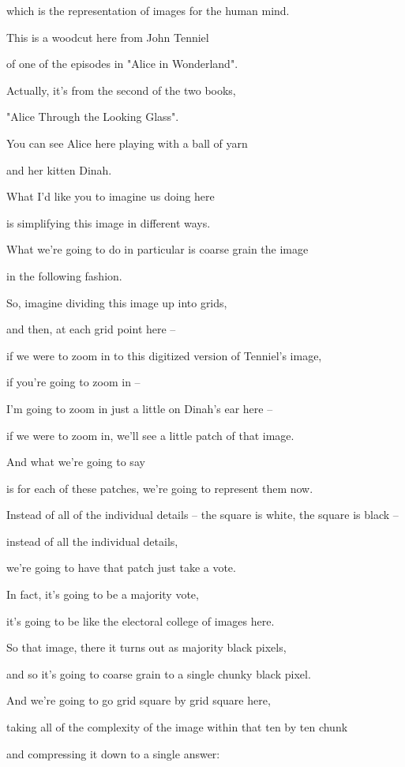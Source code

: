 \documentclass[]{article}
\begin{document}
which is the representation
of images for the human mind.

This is a woodcut here from John Tenniel

of one of the episodes
in "Alice in Wonderland".

Actually, it's from the second
of the two books,

"Alice Through the Looking Glass".

You can see Alice here
playing with a ball of yarn

and her kitten Dinah.

What I'd like you to imagine
us doing here

is simplifying this image
in different ways.

What we're going to do in particular
is coarse grain the image

in the following fashion.

So, imagine dividing
this image up into grids,

and then, at each grid point here –

if we were to zoom in to this digitized
version of Tenniel's image,

if you're going to zoom in –

I'm going to zoom in
just a little on Dinah's ear here –

if we were to zoom in,
we'll see a little patch of that image.

And what we're going to say

is for each of these patches,
we're going to represent them now.

Instead of all of the individual details –
the square is white, the square is black –

instead of all the individual details,

we're going to have that patch
just take a vote.

In fact, it's going to be a majority vote,

it's going to be like the electoral
college of images here.

So that image, there it turns out
as majority black pixels,

and so it's going to coarse grain
to a single chunky black pixel.

And we're going to go
grid square by grid square here,

taking all of the complexity
of the image within that ten by ten chunk

and compressing it down
to a single answer:
\end{document}
